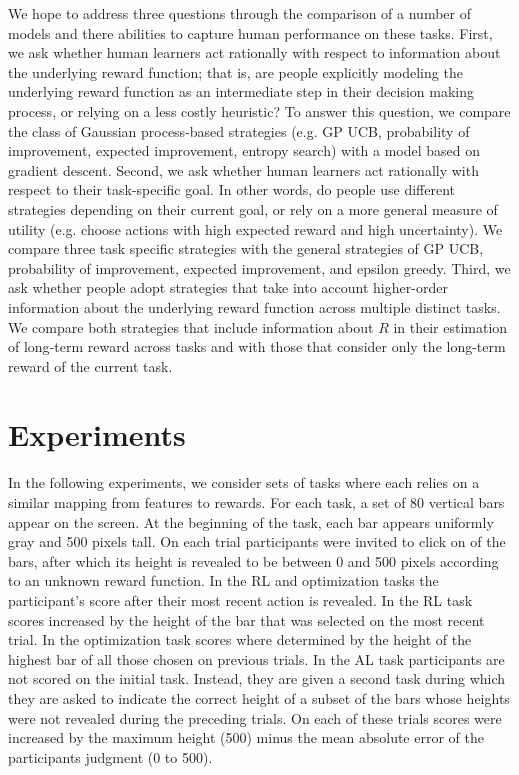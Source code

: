\documentclass[10pt,letterpaper]{article}
\begin{document}
	We hope to address three questions through the comparison of a number of models and there abilities to capture human performance on these tasks. First, we ask whether human learners act rationally with respect to information about the underlying reward function; that is, are people explicitly modeling the underlying reward function as an intermediate step in their decision making process, or relying on a less costly heuristic? To answer this question, we compare the class of Gaussian process-based strategies (e.g. GP UCB, probability of improvement, expected improvement, entropy search) with a model based on gradient descent. Second, we ask whether human learners act rationally with respect to their task-specific goal. In other words, do people use different strategies depending on their current goal, or rely on a more general measure of utility (e.g. choose actions with high expected reward and high uncertainty). We compare three task specific strategies with the general strategies of GP UCB, probability of improvement, expected improvement, and epsilon greedy. Third, we ask whether people adopt strategies that take into account higher-order information about the underlying reward function across multiple distinct tasks. We compare both strategies that include information about $R$ in their estimation of long-term reward across tasks and with those that consider only the long-term reward of the current task.
	
	\section{Experiments}
	
	In the following experiments, we consider sets of tasks where each relies on a similar mapping from features to rewards. For each task, a set of 80 vertical bars appear on the screen. At the beginning of the task, each bar appears uniformly gray and 500 pixels tall. On each trial participants were invited to click on of the bars, after which its height is revealed to be between 0 and 500 pixels according to an unknown reward function. In the RL and optimization tasks the participant's score after their most recent action is revealed. In the RL task scores increased by the height of the bar that was selected on the most recent trial. In the optimization task scores where determined by the height of the highest bar of all those chosen on previous trials. In the AL task participants are not scored on the initial task. Instead, they are given a second task during which they are asked to indicate the correct height of a subset of the bars whose heights were not revealed during the preceding trials. On each of these trials scores were increased by the maximum height (500) minus the mean absolute error of the participants judgment (0 to 500).
	
\end{document}
